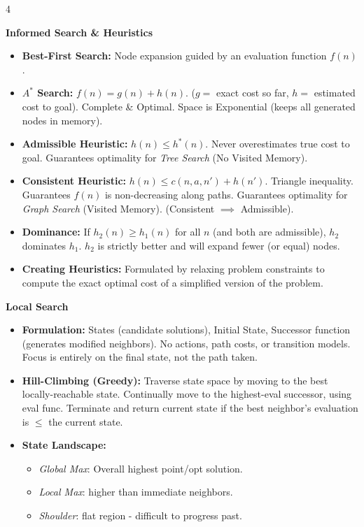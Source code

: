 \documentclass[8pt,landscape,a4paper]{extarticle}
\begin{document}
\begin{multicols*}{4}
{\vspace{1mm}
\noindent\textbf{Informed Search \& Heuristics}
\begin{itemize}[leftmargin=*, nosep]
    \item \textbf{Best-First Search:} Node expansion guided by an evaluation function $f(n)$.
    \item \textbf{$A^*$ Search:} $f(n) = g(n) + h(n)$. ($g=$ exact cost so far, $h=$ estimated cost to goal). Complete \& Optimal. Space is Exponential (keeps all generated nodes in memory).
    \item \textbf{Admissible Heuristic:} $h(n) \le h^*(n)$. Never overestimates true cost to goal. Guarantees optimality for \textit{Tree Search} (No Visited Memory).
    \item \textbf{Consistent Heuristic:} $h(n) \le c(n, a, n') + h(n')$. Triangle inequality. Guarantees $f(n)$ is non-decreasing along paths. Guarantees optimality for \textit{Graph Search} (Visited Memory). (Consistent $\implies$ Admissible).
    \item \textbf{Dominance:} If $h_2(n) \ge h_1(n)$ for all $n$ (and both are admissible), $h_2$ dominates $h_1$. $h_2$ is strictly better and will expand fewer (or equal) nodes.
    \item \textbf{Creating Heuristics:} Formulated by relaxing problem constraints to compute the exact optimal cost of a simplified version of the problem.
\end{itemize}

\noindent\textbf{Local Search}
\begin{itemize}[leftmargin=*, nosep]
    \item \textbf{Formulation:} States (candidate solutions), Initial State, Successor function (generates modified neighbors). No actions, path costs, or transition models. Focus is entirely on the final state, not the path taken.
    \item \textbf{Hill-Climbing (Greedy):} Traverse state space by moving to the best locally-reachable state. Continually move to the highest-eval successor, using eval func. Terminate and return current state if the best neighbor's evaluation is $\le$ the current state.
    \item \textbf{State Landscape:} 
    \begin{itemize}[leftmargin=*, nosep]
        \item \textit{Global Max}: Overall highest point/opt solution. 
        \item \textit{Local Max}: higher than immediate neighbors. 
        \item \textit{Shoulder}: flat region - difficult to progress past.
    \end{itemize}
\end{itemize}


}
\end{multicols*}
\end{document}
